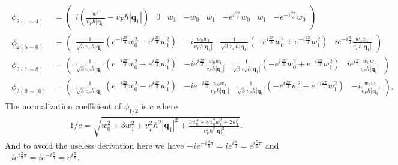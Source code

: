 \documentclass[10pt, oneside]{article}
\newcommand{\p}[1]{\left(#1\right)}
\newcommand{\bv}[1]{\left|#1\right|}
\begin{document}
\begin{align}
	\begin{split}
		\phi_{2 \p{1 \sim 4}} & = \begin{pmatrix}
			i \p{\frac{w_{0}^{2}}{v_F \hbar \bv{\bm{q}_1}} -v_F \hbar \bv{\bm{q}_1}} & 0 & w_1 & - w_0 & w_1 & - e^{i \frac{2\pi}{3}} w_0 & w_1 & - e^{- i \frac{2\pi}{3}} w_0
		\end{pmatrix} \\
		\phi_{2 \p{5 \sim 6}} & = \begin{pmatrix}
			\frac{1}{\sqrt{3} v_F \hbar \bv{\bm{q}_1}} \p{e^{-i \frac{2\pi}{3}} w_{0}^{2} - e^{i \frac{2\pi}{3}} w_{1}^{2}} & -i \frac{w_0 w_1}{v_F \hbar \bv{\bm{q}_1}} & \frac{1}{\sqrt{3} v_F \hbar \bv{\bm{q}_1}} \p{ - e^{i \frac{2\pi}{3}} w_{0}^{2} + e^{ - i \frac{2\pi}{3}} w_{1}^{2}} & i e^{-i \frac{\pi}{3}} \frac{w_0 w_1}{v_F \hbar \bv{\bm{q}_1}}
		\end{pmatrix}\\
		\phi_{2 \p{7 \sim 8 }} &  = \begin{pmatrix}
			\frac{1}{\sqrt{3} v_F \hbar \bv{\bm{q}_1}} \p{e^{-i \frac{2\pi}{3}} w_{0}^{2} - e^{i \frac{2\pi}{3}} w_{1}^{2}} & -i e^{i \frac{2\pi}{3}} \frac{w_0 w_1}{v_F \hbar \bv{\bm{q}_1}} & \frac{1}{\sqrt{3} v_F \hbar \bv{\bm{q}_1}} \p{ - e^{i \frac{2\pi}{3}} w_{0}^{2} + e^{ - i \frac{2\pi}{3}} w_{1}^{2}} & i e^{i \frac{\pi}{3}} \frac{w_0 w_1}{v_F \hbar \bv{\bm{q}_1}}
		\end{pmatrix} \\
		\phi_{2 \p{9 \sim 10}} &  = \begin{pmatrix}
			\frac{1}{\sqrt{3} v_F \hbar \bv{\bm{q}_1}} \p{e^{-i \frac{2\pi}{3}} w_{0}^{2} - e^{i \frac{2\pi}{3}} w_{1}^{2}} & -i e^{ - i \frac{2\pi}{3}} \frac{w_0 w_1}{v_F \hbar \bv{\bm{q}_1}} & \frac{1}{\sqrt{3} v_F \hbar \bv{\bm{q}_1}} \p{ - e^{i \frac{2\pi}{3}} w_{0}^{2} + e^{ - i \frac{2\pi}{3}} w_{1}^{2}} &  - i \frac{w_0 w_1}{v_F \hbar \bv{\bm{q}_1}}
		\end{pmatrix}.
	\end{split}
\end{align}
The normalization coefficient of \(\phi_{1/2}\) is \(c\) where 
\begin{align}
	1/c = \sqrt{w^2_{0} + 3 w_{1}^{2} + v_{F}^{2} \hbar ^2 \bv{\bm{q}_{1}}^2+ \frac{3 w_{0}^4 + 8 w_{0}^2 w_{1}^2 + 2 w_{1}^4}{v_{F}^{2} \hbar^2 \bv{\bm{q}}_{1}^{2}}}.
\end{align}
And to avoid the useless derivation here we have \(-i e^{-i \frac{2}{3} \pi}  = i e^{i \frac{\pi}{3}} = e^{i \frac{5}{6} \pi}\) and \(-i e^{i \frac{2}{3} \pi} = i e^{-i \frac{\pi}{3}} = e^{i \frac{\pi}{6}}\).
\end{document}
